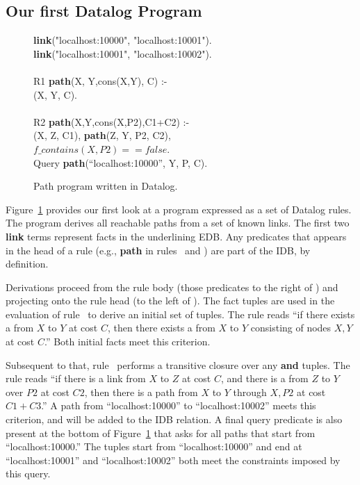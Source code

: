 \subsection{Our first Datalog Program}

\begin{figure}
\ssp
\begin{boxedminipage}{\linewidth}
{\bf link}("localhost:10000", "localhost:10001"). \\
{\bf link}("localhost:10001", "localhost:10002"). \\
\\
R1 {\bf path}(X, Y,cons(X,Y), C) :- \\
(X, Y, C). \\
\\       
R2 {\bf path}(X,Y,cons(X,P2),C1+C2) :- \\
(X, Z, C1), {\bf path}(Z, Y, P2, C2), \\
\datalogspace $f\_contains(X,P2) == false$. \\

Query {\bf path}(``localhost:10000'', Y, P, C).
\end{boxedminipage}
\caption{\label{ch:p2:fig:datalogPath}Path program written in Datalog.}
\end{figure}

Figure~\ref{ch:p2:fig:datalogPath} provides our first look at a program
expressed as a set of Datalog rules.  The program derives all reachable paths
from a set of known links.  The first two {\bf link} terms represent facts in
the underlining EDB.  Any predicates that appears in the head of a rule (e.g.,
{\bf path} in rules~ and ) are part of the IDB, by definition.

Derivations proceed from the rule body (those predicates to the right of
\ol{:-}) and projecting onto the rule head (to the left of \ol{:-}).  The
 fact tuples are used in the evaluation of rule~ to derive an
initial set of  tuples.  The rule reads ``if there exists a 
from $X$ to $Y$ at cost $C$, then there exists a  from $X$ to $Y$
consisting of nodes $X, Y$ at cost $C$.'' Both initial facts meet this criterion.

Subsequent to that, rule~ performs a transitive closure over any
 {\bf and}  tuples.  The rule reads ``if there is a link from
$X$ to $Z$ at cost $C$, and there is a  from $Z$ to $Y$ over $P2$ at
cost $C2$, then there is a path from $X$ to $Y$ through $X, P2$ at cost
$C1+C3$.'' A path from ``localhost:10000'' to ``localhost:10002'' meets this
criterion, and will be added to the IDB  relation.  A final query
predicate is also present at the bottom of Figure~\ref{ch:p2:fig:datalogPath}
that asks for all paths that start from ``localhost:10000.'' The 
tuples start from ``localhost:10000'' and end at ``localhost:10001'' and
``localhost:10002'' both meet the constraints imposed by this query.

